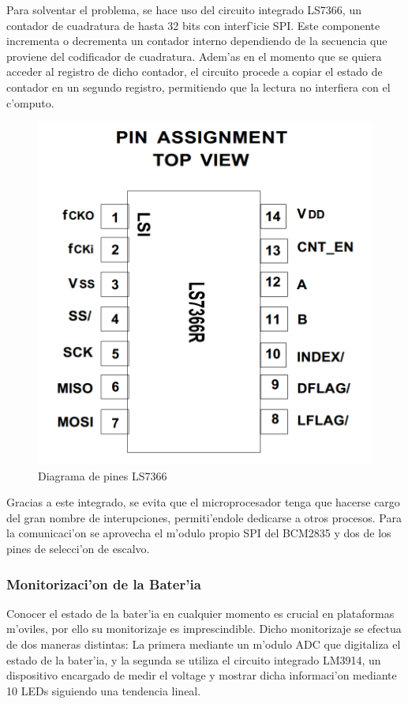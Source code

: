 \documentclass[twoside,12pt]{article}
\begin{document}
Para solventar el problema, se hace uso del circuito integrado LS7366, un contador de cuadratura de hasta 32 bits con interf'icie SPI. Este componente incrementa o decrementa un contador interno dependiendo de la secuencia que proviene del codificador de cuadratura. Adem'as en el momento que se quiera acceder al registro de dicho contador, el circuito procede a copiar el estado de contador en un segundo registro, permitiendo que la lectura no interfiera con el c'omputo.

\begin{figure}[ht]
\centering
\includegraphics[scale=0.15]{images/LS7366.png} 
\caption{Diagrama de pines LS7366}
\label{fig:LS7366}
\end{figure} 

Gracias a este integrado, se evita que el microprocesador tenga que hacerse cargo del gran nombre de interupciones, permiti'endole dedicarse a otros procesos. Para la comunicaci'on se aprovecha el m'odulo propio SPI del BCM2835 y dos de los pines de selecci'on de escalvo. 

\subsubsection{Monitorizaci'on de la Bater'ia}
Conocer el estado de la bater'ia en cualquier momento es crucial en plataformas m'oviles, por ello su monitorizaje es imprescindible. Dicho monitorizaje se efectua de dos maneras distintas: La primera mediante un m'odulo ADC que digitaliza el estado de la bater'ia, y la segunda se utiliza el circuito integrado LM3914, un dispositivo encargado de medir el voltage y mostrar dicha informaci'on mediante 10 LEDs siguiendo una tendencia lineal. 
\end{document}
